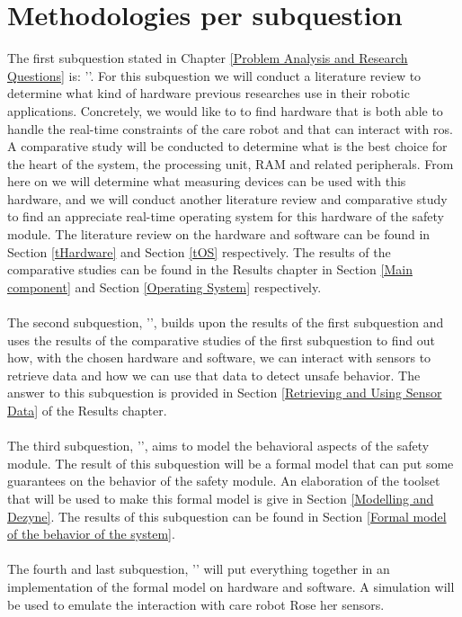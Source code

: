 \documentclass[12pt]{scrreprt}
\begin{document}
\section{Methodologies per subquestion}
\label{Methodologies per subquestion}
The first subquestion stated in Chapter \ref{Problem Analysis and Research Questions} is: '\sqone'. For this subquestion we will conduct a literature review to determine what kind of hardware previous researches use in their robotic applications. Concretely, we would like to to find hardware that is both able to handle the real-time constraints of the care robot and that can interact with \acrshort{ros}. A comparative study will be conducted to determine what is the best choice for the heart of the system, the processing unit, RAM and related peripherals. From here on we will determine what measuring devices can be used with this hardware, and we will conduct another literature review and comparative study to find an appreciate real-time operating system for this hardware of the safety module. The literature review on the hardware and software can be found in Section \ref{tHardware} and Section \ref{tOS} respectively. The results of the comparative studies can be found in the Results chapter in Section \ref{Main component} and Section \ref{Operating System} respectively.
\\\\
The second subquestion, '\sqtwo', builds upon the results of the first subquestion and uses the results of the comparative studies of the first subquestion to find out how, with the chosen hardware and software, we can interact with sensors to retrieve data and how we can use that data to detect unsafe behavior. The answer to this subquestion is provided in Section \ref{Retrieving and Using Sensor Data} of the Results chapter.
\\\\
The third subquestion, '\sqthree', aims to model the behavioral aspects of the safety module. The result of this subquestion will be a formal model that can put some guarantees on the behavior of the safety module. An elaboration of the toolset that will be used to make this formal model is give in Section \ref{Modelling and Dezyne}. The results of this subquestion can be found in Section \ref{Formal model of the behavior of the system}.
\\\\
The fourth and last subquestion, '\sqfour' will put everything together in an implementation of the formal model on hardware and software. A simulation will be used to emulate the interaction with care robot Rose her sensors.
\end{document}
